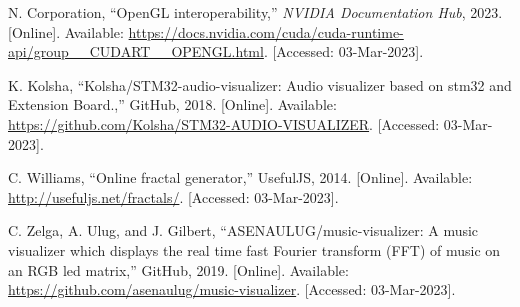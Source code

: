 \documentclass{article}
\begin{document}
\begin{thebibliography}{9}
N. Corporation, “OpenGL interoperability,” \emph{NVIDIA Documentation Hub}, 2023. [Online]. 
Available: \url{https://docs.nvidia.com/cuda/cuda-runtime-api/group__CUDART__OPENGL.html}. [Accessed: 03-Mar-2023]. 

 K. Kolsha, “Kolsha/STM32-audio-visualizer: Audio visualizer based on stm32 and Extension Board.,” GitHub, 2018. [Online]. 
 Available: \url{https://github.com/Kolsha/STM32-AUDIO-VISUALIZER}. [Accessed: 03-Mar-2023]. 

C. Williams, “Online fractal generator,” UsefulJS, 2014. [Online]. 
Available: \url{http://usefuljs.net/fractals/}. [Accessed: 03-Mar-2023]. 

C. Zelga, A. Ulug, and J. Gilbert, “ASENAULUG/music-visualizer: A music visualizer which displays the real time fast Fourier transform (FFT) of music on an RGB led matrix,” GitHub, 2019. [Online]. 
Available: \url{https://github.com/asenaulug/music-visualizer}. [Accessed: 03-Mar-2023]. 


\end{thebibliography}
\end{document}
